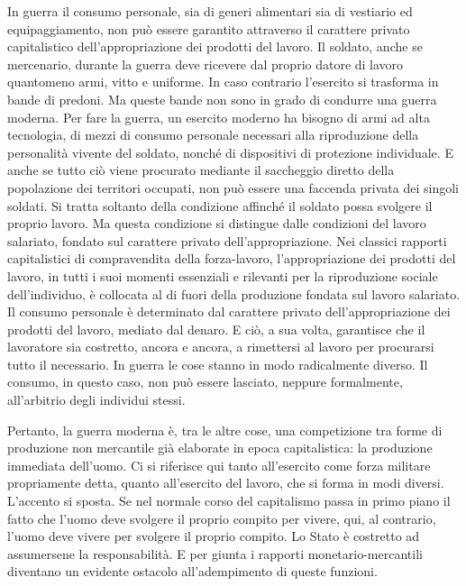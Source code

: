 \documentclass[12pt,a4paper,openany]{book}
\begin{document}
In guerra il consumo personale, sia di generi alimentari sia di vestiario ed equipaggiamento, non può essere garantito attraverso il carattere privato capitalistico dell'appropriazione dei prodotti del lavoro. Il soldato, anche se mercenario, durante la guerra deve ricevere dal proprio datore di lavoro quantomeno armi, vitto e uniforme. In caso contrario l'esercito si trasforma in bande di predoni. Ma queste bande non sono in grado di condurre una guerra moderna. Per fare la guerra, un esercito moderno ha bisogno di armi ad alta tecnologia, di mezzi di consumo personale necessari alla riproduzione della personalità vivente del soldato, nonché di dispositivi di protezione individuale. E anche se tutto ciò viene procurato mediante il saccheggio diretto della popolazione dei territori occupati, non può essere una faccenda privata dei singoli soldati. Si tratta soltanto della condizione affinché il soldato possa svolgere il proprio lavoro. Ma questa condizione si distingue dalle condizioni del lavoro salariato, fondato sul carattere privato dell'appropriazione. Nei classici rapporti capitalistici di compravendita della forza-lavoro, l'appropriazione dei prodotti del lavoro, in tutti i suoi momenti essenziali e rilevanti per la riproduzione sociale dell'individuo, è collocata al di fuori della produzione fondata sul lavoro salariato. Il consumo personale è determinato dal carattere privato dell'appropriazione dei prodotti del lavoro, mediato dal denaro. E ciò, a sua volta, garantisce che il lavoratore sia costretto, ancora e ancora, a rimettersi al lavoro per procurarsi tutto il necessario. In guerra le cose stanno in modo radicalmente diverso. Il consumo, in questo caso, non può essere lasciato, neppure formalmente, all'arbitrio degli individui stessi.

Pertanto, la guerra moderna è, tra le altre cose, una competizione tra forme di produzione non mercantile già elaborate in epoca capitalistica: la produzione immediata dell'uomo. Ci si riferisce qui tanto all'esercito come forza militare propriamente detta, quanto all'esercito del lavoro, che si forma in modi diversi. L'accento si sposta. Se nel normale corso del capitalismo passa in primo piano il fatto che l'uomo deve svolgere il proprio compito per vivere, qui, al contrario, l'uomo deve vivere per svolgere il proprio compito. Lo Stato è costretto ad assumersene la responsabilità. E per giunta i rapporti monetario-mercantili diventano un evidente ostacolo all'adempimento di queste funzioni.
\end{document}

